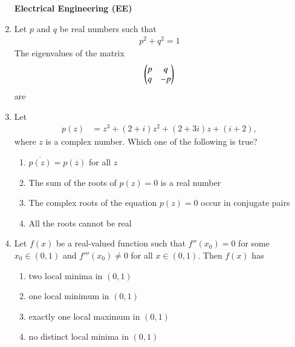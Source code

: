 \documentclass[journal,12pt,onecolumn]{IEEEtran}
\theoremstyle{remark}
\begin{document}
\begin{flushleft}
\begin{enumerate}
\begin{center}
\Large \textbf{Electrical Engineering (EE)} \\[6pt]

\end{center}






\item Let $p$ and $q$ be real numbers such that \begin{align*}
    p^2+q^2=1
\end{align*}  
The eigenvalues of the matrix  
\[
\begin{pmatrix}
p & q \\
q & -p
\end{pmatrix}
\]  
are

\begin{enumerate}
\end{enumerate}


\item Let 
\begin{align*}
p(z) &= z^3 + (2+i)z^2 + (2+3i)z + (i+2),
\end{align*}
where $z$ is a complex number. Which one of the following is true?

\begin{enumerate}
\item $\overline{p(z)} = p(\overline{z})$ for all $z$
\item The sum of the roots of $p(z)=0$ is a real number
\item The complex roots of the equation $p(z)=0$ occur in conjugate pairs
\item All the roots cannot be real
\end{enumerate}


\item Let $f(x)$ be a real-valued function such that $f''(x_0)=0$ for some $x_0 \in (0,1)$ and $f'''(x_0)\neq 0$ for all $x \in (0,1)$.  
Then $f(x)$ has

\begin{enumerate}
\item two local minima in $(0,1)$
\item one local minimum in $(0,1)$
\item exactly one local maximum in $(0,1)$
\item no distinct local minima in $(0,1)$
\end{enumerate}



\end{enumerate}
\end{flushleft}
\end{document}
